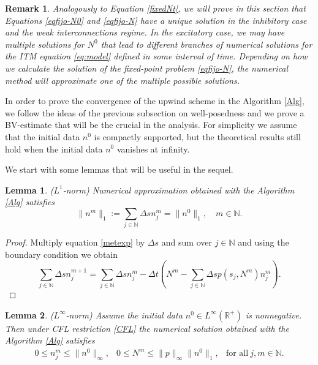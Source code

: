 \documentclass[11pt,a4paper]{article}
\newcommand{\R}{\mathbb{R}}
\newcommand{\N}{\mathbb{N}}
\newtheorem{lemma}{Lemma}[section]
\newtheorem{remark}{Remark}[section]
\begin{document}
\begin{remark}
 Analogously to Equation \eqref{fixedNt}, we will prove in this section that Equations \eqref{eqfijo-N0} and \eqref{eqfijo-N} have a unique solution in the inhibitory case and the weak interconnections regime. In the excitatory case, we may have multiple solutions for $N^0$ that lead to different branches of numerical solutions for the ITM equation \eqref{eq:model} defined in some interval of time. Depending on how we calculate the solution of the fixed-point problem \eqref{eqfijo-N}, the numerical method will approximate one of the multiple possible solutions.   
\end{remark}

In order to prove the convergence of the upwind scheme in the Algorithm \ref{Alg}, we follow the ideas of the previous subsection on well-posedness and we prove a BV-estimate that will be the crucial in the analysis. For simplicity we assume that the initial data $n^0$ is compactly supported, but the theoretical results still hold when the initial data $n^0$ vanishes at infinity.

We start with some lemmas that will be useful in the sequel. 
 \begin{lemma}{(\textbf{$L^{1}$}-norm)}
 \label{L1-Mass}Numerical approximation obtained with the Algorithm \ref{Alg} satisfies 
 \begin{equation*}
     \|n^{m}\|_1:=\sum_{j\in\N}\Delta s n_j^m=\|n^{0}\|_1, \quad m\in\N.
 \end{equation*}
 \end{lemma}
 \begin{proof}
 Multiply equation \eqref{metexp} by $\Delta s$ and sum over $j\in\N$ and using the boundary condition we obtain 
\begin{equation*}
    \sum_{j\in\N}\Delta s n_j^{m+1}=\sum_{j\in\N}\Delta s n_j^m-\Delta t \left( N^m- \sum_{j\in\N}\Delta s p(s_j,N^m)n_j^m \right).
\end{equation*}
 \end{proof}

\begin{lemma}{(\textbf{$L^{\infty}$}-norm)}
\label{L-infty}
Assume the initial data $n^0\in L^\infty(\R^+)$ is nonnegative. Then under CFL restriction \eqref{CFL} the numerical solution obtained with the Algorithm \ref{Alg} satisfies
\begin{eqnarray*}
 0\le n^m_j\le \|n^0\|_\infty, & 0\le N^m\le \|p\|_\infty\|n^0\|_1, & \textrm{for all}\:j,m\in\N.
\end{eqnarray*}
\end{lemma}
\end{document}
